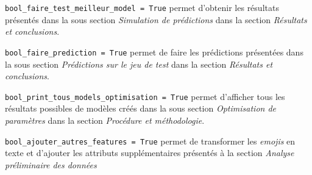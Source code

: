 \verb|bool_faire_test_meilleur_model = True| permet d'obtenir les résultats présentés dans la sous section \emph{Simulation de prédictions} dans la section \emph{Résultats et conclusions}. 

\verb|bool_faire_prediction = True| permet de faire les prédictions présentées dans la sous section \emph{Prédictions sur le jeu de test} dans la section \emph{Résultats et conclusions}. 

\verb|bool_print_tous_models_optimisation = True| permet d'afficher tous les résultats possibles de modèles créés dans la sous section \emph{Optimisation de paramètres} dans la section \emph{Procédure et méthodologie}. 

\verb|bool_ajouter_autres_features = True| permet de transformer les \emph{emojis} en texte et d'ajouter les attributs supplémentaires présentés à la section \emph{Analyse préliminaire des données}